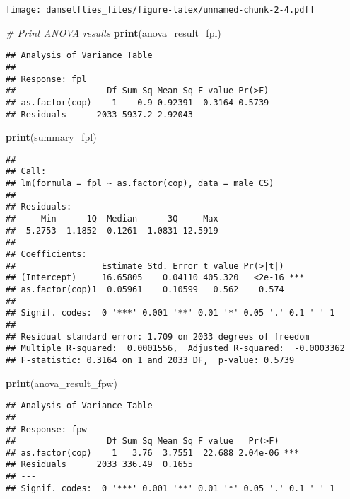 \documentclass[
]{article}
\newenvironment{Shaded}{\begin{snugshade}}{\end{snugshade}}
\newcommand{\CommentTok}[1]{\textcolor[rgb]{0.56,0.35,0.01}{\textit{#1}}}
\newcommand{\FunctionTok}[1]{\textcolor[rgb]{0.13,0.29,0.53}{\textbf{#1}}}
\newcommand{\NormalTok}[1]{#1}
\begin{document}
\texttt{[image: damselflies\_files/figure-latex/unnamed-chunk-2-4.pdf]}

\begin{Shaded}
\begin{Highlighting}[]
\CommentTok{\# Print ANOVA results}
\FunctionTok{print}\NormalTok{(anova\_result\_fpl)}
\end{Highlighting}
\end{Shaded}

\begin{verbatim}
## Analysis of Variance Table
## 
## Response: fpl
##                  Df Sum Sq Mean Sq F value Pr(>F)
## as.factor(cop)    1    0.9 0.92391  0.3164 0.5739
## Residuals      2033 5937.2 2.92043
\end{verbatim}

\begin{Shaded}
\begin{Highlighting}[]
\FunctionTok{print}\NormalTok{(summary\_fpl)}
\end{Highlighting}
\end{Shaded}

\begin{verbatim}
## 
## Call:
## lm(formula = fpl ~ as.factor(cop), data = male_CS)
## 
## Residuals:
##     Min      1Q  Median      3Q     Max 
## -5.2753 -1.1852 -0.1261  1.0831 12.5919 
## 
## Coefficients:
##                 Estimate Std. Error t value Pr(>|t|)    
## (Intercept)     16.65805    0.04110 405.320   <2e-16 ***
## as.factor(cop)1  0.05961    0.10599   0.562    0.574    
## ---
## Signif. codes:  0 '***' 0.001 '**' 0.01 '*' 0.05 '.' 0.1 ' ' 1
## 
## Residual standard error: 1.709 on 2033 degrees of freedom
## Multiple R-squared:  0.0001556,  Adjusted R-squared:  -0.0003362 
## F-statistic: 0.3164 on 1 and 2033 DF,  p-value: 0.5739
\end{verbatim}

\begin{Shaded}
\begin{Highlighting}[]
\FunctionTok{print}\NormalTok{(anova\_result\_fpw)}
\end{Highlighting}
\end{Shaded}

\begin{verbatim}
## Analysis of Variance Table
## 
## Response: fpw
##                  Df Sum Sq Mean Sq F value   Pr(>F)    
## as.factor(cop)    1   3.76  3.7551  22.688 2.04e-06 ***
## Residuals      2033 336.49  0.1655                     
## ---
## Signif. codes:  0 '***' 0.001 '**' 0.01 '*' 0.05 '.' 0.1 ' ' 1
\end{verbatim}
\end{document}
